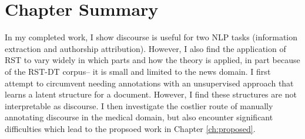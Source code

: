 
\section{Chapter Summary}
In my completed work, I show discourse is useful for two NLP tasks (information extraction and authorship attribution). However, I also find the application of RST to vary widely in which parts and how the theory is applied, in part because of the RST-DT corpus-- it is small and limited to the news domain. I first attempt to circumvent needing annotations with an unsupervised approach that learns a latent structure for a document. However, I find these structures are not interpretable as discourse. I then investigate the costlier route of manually annotating discourse in the medical domain, but also encounter significant difficulties which lead to the propsoed work in Chapter \ref{ch:proposed}.

